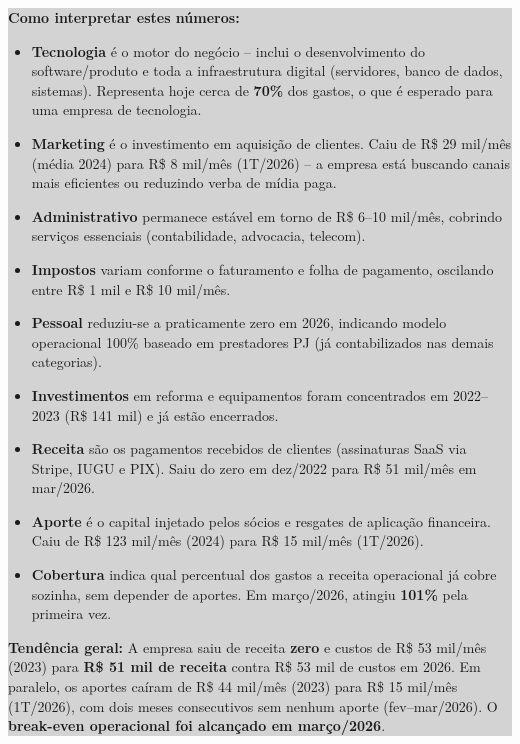 \documentclass[12pt, a4paper]{article}
\begin{document}
\colorbox{lightGray}{%
    \parbox{0.95\textwidth}{%
        \vspace{0.3cm}
        \textbf{Como interpretar estes números:}
        \begin{itemize}[nosep, leftmargin=*]
            \item \textbf{Tecnologia} é o motor do negócio -- inclui o desenvolvimento do software/produto e toda a infraestrutura digital (servidores, banco de dados, sistemas). Representa hoje cerca de \textbf{70\%} dos gastos, o que é esperado para uma empresa de tecnologia.
            \item \textbf{Marketing} é o investimento em aquisição de clientes. Caiu de R\$ 29 mil/mês (média 2024) para R\$ 8 mil/mês (1T/2026) -- a empresa está buscando canais mais eficientes ou reduzindo verba de mídia paga.
            \item \textbf{Administrativo} permanece estável em torno de R\$ 6--10 mil/mês, cobrindo serviços essenciais (contabilidade, advocacia, telecom).
            \item \textbf{Impostos} variam conforme o faturamento e folha de pagamento, oscilando entre R\$ 1 mil e R\$ 10 mil/mês.
            \item \textbf{Pessoal} reduziu-se a praticamente zero em 2026, indicando modelo operacional 100\% baseado em prestadores PJ (já contabilizados nas demais categorias).
            \item \textbf{Investimentos} em reforma e equipamentos foram concentrados em 2022--2023 (R\$ 141 mil) e já estão encerrados.
            \item \textcolor{successGreen}{\textbf{Receita}} são os pagamentos recebidos de clientes (assinaturas SaaS via Stripe, IUGU e PIX). Saiu do zero em dez/2022 para R\$ 51 mil/mês em mar/2026.
            \item \textcolor{warningOrange}{\textbf{Aporte}} é o capital injetado pelos sócios e resgates de aplicação financeira. Caiu de R\$ 123 mil/mês (2024) para R\$ 15 mil/mês (1T/2026).
            \item \textbf{Cobertura} indica qual percentual dos gastos a receita operacional já cobre sozinha, sem depender de aportes. Em março/2026, atingiu \textbf{101\%} pela primeira vez.
        \end{itemize}
        \vspace{0.2cm}
        \textbf{Tendência geral:} A empresa saiu de receita \textbf{zero} e custos de R\$ 53 mil/mês (2023) para \textbf{R\$ 51 mil de receita} contra R\$ 53 mil de custos em 2026. Em paralelo, os aportes caíram de R\$ 44 mil/mês (2023) para R\$ 15 mil/mês (1T/2026), com dois meses consecutivos sem nenhum aporte (fev--mar/2026). O \textbf{break-even operacional foi alcançado em março/2026}.
        \vspace{0.3cm}
    }%
}
\end{document}
